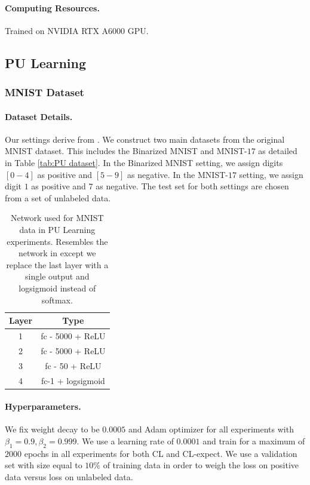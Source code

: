 \documentclass{article}
\begin{document}
\paragraph{Computing Resources.} Trained on NVIDIA RTX A$6000$ GPU.




\subsection{PU Learning}
\subsubsection{MNIST Dataset}
\paragraph{Dataset Details.} Our settings derive from \citet{garg2021mixture}. We construct two main datasets from the original MNIST dataset. This includes the Binarized MNIST and MNIST-$17$ as detailed in Table \ref{tab:PU dataset}. In the Binarized MNIST setting, we assign digits $[0 - 4]$ as positive and $[5 - 9]$ as negative. In the MNIST-$17$ setting, we assign digit $1$ as positive and $7$ as negative. The test set for both settings are chosen from a set of unlabeled data.

\begin{table}[h]
    \centering
    \caption{Network used for MNIST data in PU Learning experiments. Resembles the network in \citet{garg2021mixture} except we replace the last layer with a single output and logsigmoid instead of softmax.}
    \begin{tabular}{c|c}
        \toprule
         Layer & Type\\
         \midrule
         1 & fc - 5000 + ReLU\\
         2 & fc - 5000 +  ReLU\\
         3 & fc - 50 + ReLU \\
         4 & fc-1 + logsigmoid\\
         \bottomrule
    \end{tabular}
    \label{tab:PU MLP1}
\end{table}

\paragraph{Hyperparameters.} We fix weight decay to be $0.0005$ and Adam optimizer for all experiments with $\beta_1 = 0.9, \beta_2 = 0.999$. We use a learning rate of $0.0001$ and train for a maximum of $2000$ epochs in all experiments for both CL and CL-expect. We use a validation set with size equal to $10\%$ of training data in order to weigh the loss on positive data versus loss on unlabeled data.
\end{document}
